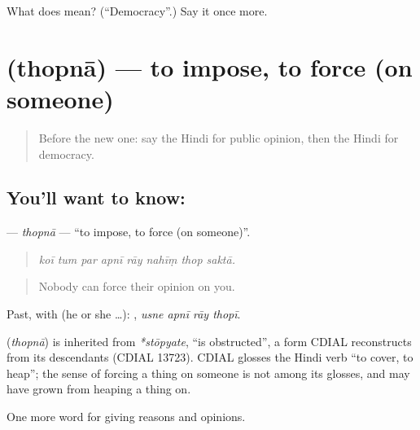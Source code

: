 \begin{tcolorbox}[breakable,colback=teal!4,colframe=teal!35!black,title={Before you move on}]
What does  mean? (\textquotedblleft{}Democracy\textquotedblright{}.) Say it once more.
\end{tcolorbox}
\section[\texorpdfstring{\hi{थोपना} (thopnā)}{थोपना (thopnā)}]{ (thopnā) — to impose, to force (on someone)}

\label{lesson:HI-C354-thopna}



\begin{quote}
Before the new one: say the Hindi for public opinion, then the Hindi for democracy.
\end{quote}

\subsection*{You'll want to know: }
\textbf{} — \emph{thopnā} — \textquotedblleft{}to impose, to force (on someone)\textquotedblright{}.

\begin{quote}
       
\end{quote}

\begin{quote}
\emph{koī tum par apnī rāy nahīṃ thop saktā.}
\end{quote}

\begin{quote}
Nobody can force their opinion on you.
\end{quote}

Past, with  (he or she …):    , \emph{usne apnī rāy thopī}.

\begin{cousinweb}
\textbf{} (\emph{thopnā}) is inherited from \emph{*stōpyate}, \textquotedblleft{}is obstructed\textquotedblright{}, a form CDIAL reconstructs from its descendants (CDIAL 13723). CDIAL glosses the Hindi verb \textquotedblleft{}to cover, to heap\textquotedblright{}; the sense of forcing a thing on someone is not among its glosses, and may have grown from heaping a thing on.
\end{cousinweb}

\begin{grammarlens}[title={What you've built}]
One more word for giving reasons and opinions.
\end{grammarlens}

